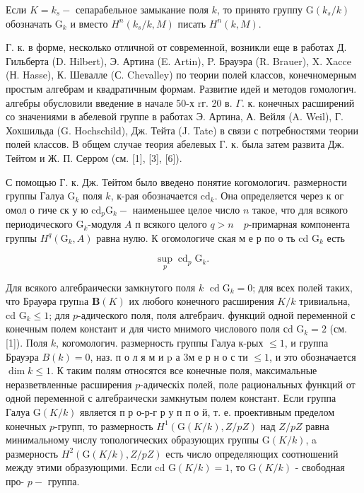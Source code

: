 \documentclass[10pt]{article}
\begin{document}
Если $K=k_{s}-$ сепарабельное замыкание поля $k$, то принято группу $\mathrm{G}\left(k_{s} / k\right)$ обозначать $\mathrm{G}_{k}$ и вместо $H^{n}\left(k_{s} / k, M\right)$ писать $H^{n}(k, M)$.



Г. к. в форме, несколько отличной от современной, возникли еще в работах Д. Гильберта (D. Hilbert), Э. Артина (E. Artin), P. Брауэра (R. Brauer), X. Xacce (Н. Hasse), К. Шевалле (С. Chevalley) по теории полей классов, конечномерным простым алгебрам и квадратичным формам. Развитие идей и методов гомологич. алгебры обусловили введение в начале 50-х rг. 20 в. $\Gamma$. к. конечных расширений со значениями в абелевой группе в работах Э. Артина, А. Вейля (A. Weil), Г. Хохшильда (G. Hochschild), Дж. Тейта (J. Tate) в связи с потребностями теории полей классов. В общем случае теория абелевых $Г$. к. была затем развита Дж. Тейтом и Ж. П. Серром (см. [1], [3], [6]).



С помощью Г. к. Дж. Тейтом было введено понятие когомологич. размерности группы Галуа $\mathrm{G}_{k}$ поля $k$, к-рая обозначается $\mathrm{cd}_{k}$. Она определяется через к ог омол о гиче ск у ю $\mathrm{cd}_{p} \mathrm{G}_{k}-$ наименьшее целое число $n$ такое, что для всякого периодического $\mathrm{G}_{k}$-модуля $A$ п всякого целого $q>n \quad p$-примарная компонента группы $H^{q}\left(\mathrm{G}_{k}, A\right)$ равна нулю. К огомологиче ская м е р по о ть cd $\mathrm{G}_{k}$ есть



\[

\sup _{p} \operatorname{cd}_{p} \mathrm{G}_{k} \text {. }

\]



Для всякого алгебраически замкнутого поля $k$ $\operatorname{cd} \mathrm{G}_{k}=0$; для всех полей таких, что Брауәра групnа $\boldsymbol{B}(K)$ их любого конечного расширения $K / k$ тривиальна, cd $\mathrm{G}_{k} \leqslant 1$; для $p$-адического поля, поля алгебраич. функций одной переменной с конечным полем констант и для чисто мнимого числового поля сd $\mathrm{G}_{k}=2$ (см. [1]). Поля $k$, когомологич. размерность группы Галуа к-рых $\leqslant 1$, и группа Брауэра $B(k)=0$, наз. п о л я м и p а 3м е р н о с ти $\leqslant 1$, и это обозначается $\operatorname{dim} k \leqslant 1$. $К$ таким полям относятся все конечные поля, максимальные неразветвленные расширения $p$-адическіх полей, поле рациональных функций от одной переменной с алгебраически замкнутым полем констант. Если группа Галуа $\mathrm{G}(K / k)$ является п р о-р-г р у п п о й, т. е. проективным пределом конечных $p$-групп, то размерность $H^{1}(\mathrm{G}(K / k), Z / p Z)$ над $Z / p Z$ равна минимальному числу топологических образующих группы $\mathrm{G}(K / k)$, a размерность $H^{2}(\mathrm{G}(K / k), Z / p Z)$ есть число определяющих соотношений между этими образующими. Если cd $\mathrm{G}(K / k)=1$, то $\mathrm{G}(K / k)$ - свободная про- $p-$ группа.
\end{document}
